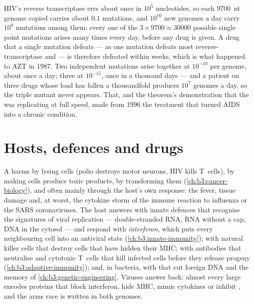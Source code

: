 \begin{example}\label{ex:b3:virology:three-drugs}
HIV's reverse transcriptase errs about once in $10^{5}$ nucleotides, so
each \qty{9700}{nt} genome copied carries about $0.1$ mutations, and
$10^{10}$ new genomes a day carry $10^{9}$ mutations among them: every
one of the $3\times 9700 \approx \num{30000}$ possible single point
mutations arises many times every day, before any drug is given. A
drug that a single mutation defeats --- as one mutation defeats most
reverse-transcriptase and  --- is therefore defeated
within weeks, which is what happened to AZT in 1987. Two independent
mutations arise together at $10^{-10}$ per genome, about once a day;
three at $10^{-15}$, once in a thousand days --- and a patient on three
drugs whose load has fallen a thousandfold produces $10^{7}$ genomes a
day, so the triple mutant never appears. That, and the theorem's
demonstration that the  was replicating at full speed, made
 from 1996 the treatment that turned AIDS into a
chronic condition.
\end{example}

\section{Hosts, defences and drugs}

\begin{proposition}\label{prop:b3:virology:pathogenesis}
A  harms by lysing cells (polio destroys motor neurons, HIV kills
T~cells), by making cells produce toxic products, by transforming them
(\cref{ch:b3:cancer-biology}), and often mainly through the host's own
response: the fever, tissue damage and, at worst, the cytokine storm of
the immune reaction to influenza or the SARS coronaviruses. The host
answers with innate defences that recognise the signatures of viral
replication --- double-stranded RNA, RNA without a cap, DNA in the
cytosol --- and respond with \emph{interferon}, which puts every
neighbouring cell into an antiviral state (\cref{ch:b3:innate-immunity});
with natural killer cells that destroy cells that have hidden their MHC;
with antibodies that neutralise  and cytotoxic T~cells that kill
infected cells before they release progeny (\cref{ch:b3:adaptive-immunity});
and, in bacteria, with  that cut foreign DNA and the
 memory of \cref{ch:b3:genetic-engineering}. Viruses answer back:
almost every large  encodes proteins that block interferon, hide
MHC, mimic cytokines or inhibit , and the arms race is
written in both genomes.
\end{proposition}

